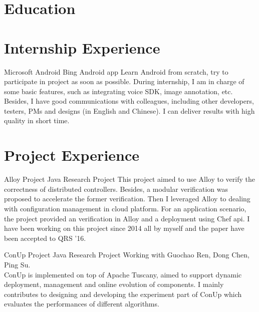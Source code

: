 \documentclass[11pt,a4paper]{moderncv}
\title{}
\begin{document}
\maketitle

\section{Education}

\section{Internship Experience}

{Microsoft}
{Android}
{Bing Android app}{}
{
Learn Android from scratch, try to participate in project as soon as possible. During internship, I am in charge of some basic features, such as integrating voice SDK, image annotation, etc. Besides, I have good communications with colleagues, including other developers, testers, PMs and designs (in English and Chinese). I can deliver results with high quality in short time.
}

\section{Project Experience}

{Alloy Project}
{Java}
{Research Project}{}
{
This project aimed to use Alloy to verify the correctness of distributed controllers. Besides, a modular verification was proposed to accelerate the former verification. Then I leveraged Alloy to dealing with configuration management in cloud platform. For an application scenario, the project provided an verification in Alloy and a deployment using Chef api. I have been working on this project since 2014 all
by myself and the paper have been accepted to QRS '16.
}

\vspace*{0.2\baselineskip}

{ConUp Project}
{Java}
{Research Project}{}
{
Working with Guochao Ren, Dong Chen, Ping Su.\\
ConUp is implemented on top of Apache Tuscany, aimed to support dynamic deployment, management and online evolution of components. I mainly contributes to designing and developing the experiment part of ConUp which evaluates the performances of different algorithms.
}
\end{document}
